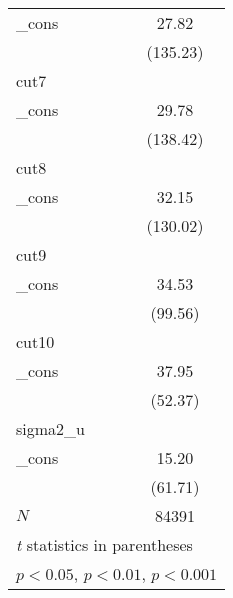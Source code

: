 {\begin{tabular}{l*{1}{c}}
\_cons      &       27.82\sym{***}\\
            &    (135.23)         \\
\hline
cut7        &                     \\
\_cons      &       29.78\sym{***}\\
            &    (138.42)         \\
\hline
cut8        &                     \\
\_cons      &       32.15\sym{***}\\
            &    (130.02)         \\
\hline
cut9        &                     \\
\_cons      &       34.53\sym{***}\\
            &     (99.56)         \\
\hline
cut10       &                     \\
\_cons      &       37.95\sym{***}\\
            &     (52.37)         \\
\hline
sigma2\_u    &                     \\
\_cons      &       15.20\sym{***}\\
            &     (61.71)         \\
\hline
\(N\)       &       84391         \\
\hline\hline
\multicolumn{2}{l}{\footnotesize \textit{t} statistics in parentheses}\\
\multicolumn{2}{l}{\footnotesize \sym{*} \(p<0.05\), \sym{**} \(p<0.01\), \sym{***} \(p<0.001\)}\\
\end{tabular}
}
